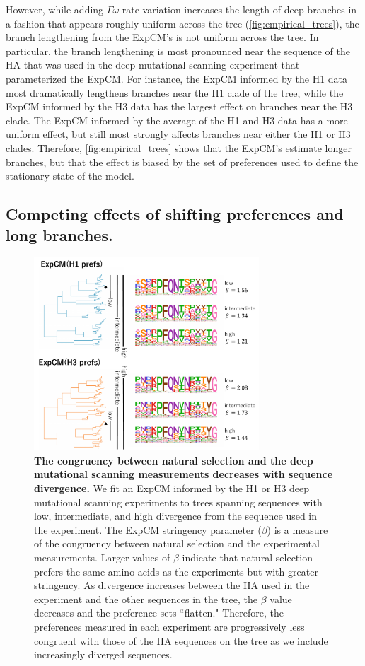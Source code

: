 \documentclass[11pt]{article}
\begin{document}
However, while adding $\Gamma\omega$ rate variation increases the length of deep branches in a fashion that appears roughly uniform across the tree (\ref{fig:empirical_trees}), the branch lengthening from the ExpCM's is not uniform across the tree. 
In particular, the branch lengthening is most pronounced near the sequence of the HA that was used in the deep mutational scanning experiment that parameterized the ExpCM.
For instance, the ExpCM informed by the H1 data most dramatically lengthens branches near the H1 clade of the tree, while the ExpCM informed by the H3 data has the largest effect on branches near the H3 clade.
The ExpCM informed by the average of the H1 and H3 data has a more uniform effect, but still most strongly affects branches near either the H1 or H3 clades.
Therefore, \ref{fig:empirical_trees} shows that the ExpCM's estimate longer branches, but that the effect is biased by the set of preferences used to define the stationary state of the model.

\subsection*{Competing effects of shifting preferences and long branches.}

\begin{figure}
\centerline{\includegraphics[width=0.75\textwidth]{figures/compete}}
\caption{\label{fig:compete}
\textbf{The congruency between natural selection and the deep mutational scanning measurements decreases with sequence divergence.} 
We fit an ExpCM informed by the H1 or H3 deep mutational scanning experiments to trees spanning sequences with low, intermediate, and high divergence from the sequence used in the experiment. 
The ExpCM stringency parameter ($\beta$) is a measure of the congruency between natural selection and the experimental measurements. 
Larger values of $\beta$ indicate that natural selection prefers the same amino acids as the experiments but with greater stringency. 
As divergence increases between the HA used in the experiment and the other sequences in the tree, the $\beta$ value decreases and the preference sets ``flatten."
Therefore, the preferences measured in each experiment are progressively less congruent with those of the HA sequences on the tree as we include increasingly diverged sequences. 
}
\end{figure}
\end{document}
